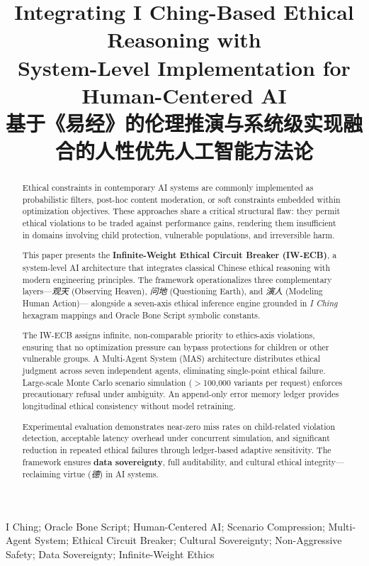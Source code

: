 \documentclass[conference]{IEEEtran}
\title{
  Integrating I Ching-Based Ethical Reasoning with\\
  System-Level Implementation for Human-Centered AI\\
  \large 基于《易经》的伦理推演与系统级实现融合的人性优先人工智能方法论
}
\author{
  \IEEEauthorblockN{Lucky (诸葛鑫)\ \ UID9622}
  \IEEEauthorblockA{
    Chinese Natural Semantic Humanity (CNSH) Framework\\
    GPG: A2D0092CEE2E5BA87035600924C3704A8CC26D5F\\
    Email: fireroot.lad@outlook.com
  }
}
\begin{document}
\maketitle

\begin{abstract}
Ethical constraints in contemporary AI systems are commonly
implemented as probabilistic filters, post-hoc content moderation,
or soft constraints embedded within optimization objectives.
These approaches share a critical structural flaw: they permit
ethical violations to be traded against performance gains,
rendering them insufficient in domains involving child protection,
vulnerable populations, and irreversible harm.

This paper presents the \textbf{Infinite-Weight Ethical Circuit
Breaker (IW-ECB)}, a system-level AI architecture that integrates
classical Chinese ethical reasoning with modern engineering
principles. The framework operationalizes three complementary
layers---\textit{观天} (Observing Heaven), \textit{问地}
(Questioning Earth), and \textit{演人} (Modeling Human Action)---
alongside a seven-axis ethical inference engine grounded in
\textit{I Ching} hexagram mappings and Oracle Bone Script symbolic
constants.

The IW-ECB assigns infinite, non-comparable priority to
ethics-axis violations, ensuring that no optimization pressure can
bypass protections for children or other vulnerable groups.
A Multi-Agent System (MAS) architecture distributes ethical
judgment across seven independent agents, eliminating single-point
ethical failure. Large-scale Monte Carlo scenario simulation
($>$100{,}000 variants per request) enforces precautionary
refusal under ambiguity. An append-only error memory ledger
provides longitudinal ethical consistency without model retraining.

Experimental evaluation demonstrates near-zero miss rates on
child-related violation detection, acceptable latency overhead
under concurrent simulation, and significant reduction in repeated
ethical failures through ledger-based adaptive sensitivity.
The framework ensures \textbf{data sovereignty}, full auditability,
and cultural ethical integrity---reclaiming virtue (\textit{德})
in AI systems.
\end{abstract}

\begin{IEEEkeywords}
I Ching; Oracle Bone Script; Human-Centered AI; Scenario
Compression; Multi-Agent System; Ethical Circuit Breaker;
Cultural Sovereignty; Non-Aggressive Safety; Data Sovereignty;
Infinite-Weight Ethics
\end{IEEEkeywords}
\end{document}

